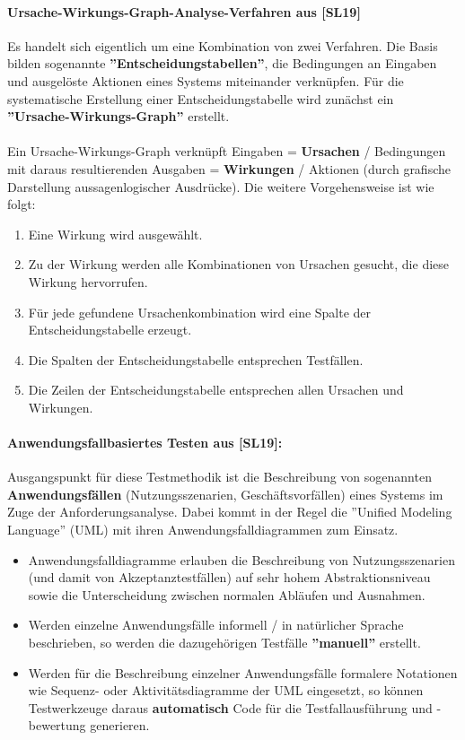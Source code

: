 \paragraph{Ursache-Wirkungs-Graph-Analyse-Verfahren aus [SL19]}

Es handelt sich eigentlich um eine Kombination von zwei Verfahren. Die Basis bilden sogenannte \textbf{''Entscheidungstabellen''}, die Bedingungen an Eingaben und ausgelöste Aktionen eines Systems miteinander verknüpfen. Für die systematische Erstellung einer Entscheidungstabelle wird zunächst ein \textbf{''Ursache-Wirkungs-Graph''} erstellt.
\\
\\
Ein Ursache-Wirkungs-Graph verknüpft Eingaben = \textbf{Ursachen} / Bedingungen mit daraus resultierenden Ausgaben = \textbf{Wirkungen} / Aktionen (durch grafische Darstellung aussagenlogischer Ausdrücke). Die weitere Vorgehensweise ist wie folgt:
\begin{enumerate}
	\item Eine Wirkung wird ausgewählt.
	\item Zu der Wirkung werden alle Kombinationen von Ursachen gesucht, die diese Wirkung hervorrufen.
	\item Für jede gefundene Ursachenkombination wird eine Spalte der Entscheidungstabelle erzeugt.
	\item Die Spalten der Entscheidungstabelle entsprechen Testfällen.
	\item Die Zeilen der Entscheidungstabelle entsprechen allen Ursachen und Wirkungen.
\end{enumerate}

\paragraph{Anwendungsfallbasiertes Testen aus [SL19]:}

Ausgangspunkt für diese Testmethodik ist die Beschreibung von sogenannten \textbf{Anwendungsfällen} (Nutzungsszenarien, Geschäftsvorfällen) eines Systems im Zuge der Anforderungsanalyse. Dabei kommt in der Regel die ''Unified Modeling Language'' (UML) mit ihren Anwendungsfalldiagrammen zum Einsatz.
\begin{itemize}
	\item Anwendungsfalldiagramme erlauben die Beschreibung von Nutzungsszenarien (und damit von Akzeptanztestfällen) auf sehr hohem Abstraktionsniveau sowie die Unterscheidung zwischen normalen Abläufen und Ausnahmen.
	\item Werden einzelne Anwendungsfälle informell / in natürlicher Sprache beschrieben, so werden die dazugehörigen Testfälle \textbf{''manuell''} erstellt.
	\item Werden für die Beschreibung einzelner Anwendungsfälle formalere Notationen wie Sequenz- oder Aktivitätsdiagramme der UML eingesetzt, so können Testwerkzeuge daraus \textbf{automatisch} Code für die Testfallausführung und -bewertung generieren.
\end{itemize}

